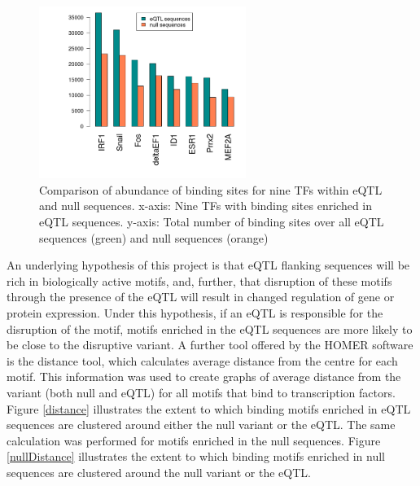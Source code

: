 \documentclass[12pt]{article}
\begin{document}
\begin{figure}[!htbp]
\centering
\includegraphics[width= 0.6\textwidth]{Top9TFsComparison.png} 
\caption{Comparison of abundance of binding sites for nine TFs within eQTL and null sequences. x-axis: Nine TFs with binding sites enriched in eQTL sequences. y-axis: Total number of binding sites over all eQTL sequences (green) and null sequences (orange)} 
\label{top9Comparison}
\end{figure}
\newpage

An underlying hypothesis of this project is that eQTL flanking sequences will be rich in biologically active motifs, and, further, that disruption of these motifs through the presence of the eQTL will result in changed regulation of gene or protein expression. Under this hypothesis, if an eQTL is responsible for the disruption of the motif, motifs enriched in the eQTL sequences are more likely to be close to the disruptive variant. A further tool offered by the HOMER software is the distance tool, which calculates average distance from the centre for each motif. This information was used to create graphs of average distance from the variant (both null and eQTL) for all motifs that bind to transcription factors. Figure \ref{distance} illustrates the extent to which binding motifs enriched in eQTL sequences are clustered around either the null variant or the eQTL. The same calculation was performed for motifs enriched in the null sequences. Figure \ref{nullDistance} illustrates the extent to which binding motifs enriched in null sequences are clustered around the null variant or the eQTL. 
\end{document}
